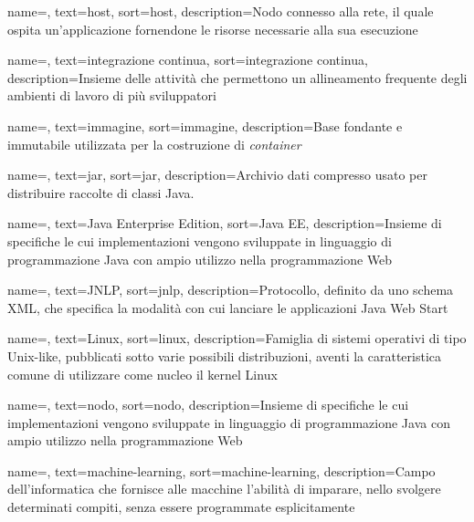 {
    name=,
    text=host,
    sort=host,
    description={Nodo connesso alla rete, il quale ospita un'applicazione fornendone le risorse necessarie alla sua esecuzione}
}

{
    name=,
    text=integrazione continua,
    sort=integrazione continua,
    description={Insieme delle attività che permettono un allineamento frequente degli ambienti di lavoro di più sviluppatori}
}

{
    name=,
    text=immagine,
    sort=immagine,
    description={Base fondante e immutabile utilizzata per la costruzione di \textit{container}}
}

{
    name=,
    text=jar,
    sort=jar,
    description={Archivio dati compresso usato per distribuire raccolte di classi Java.}
}
 
{
    name=,
    text=Java Enterprise Edition,
    sort=Java EE,
    description={Insieme di specifiche le cui implementazioni vengono sviluppate in linguaggio di programmazione Java con ampio utilizzo nella programmazione Web}
}

{
    name=,
    text=JNLP,
    sort=jnlp,
    description={Protocollo, definito da uno schema XML, che specifica la modalità con cui lanciare le applicazioni Java Web Start}
}

{
    name=,
    text=Linux,
    sort=linux,
    description={Famiglia di sistemi operativi di tipo Unix-like, pubblicati sotto varie possibili distribuzioni, aventi la caratteristica comune di utilizzare come nucleo il kernel Linux}
}

{
    name=,
    text=nodo,
    sort=nodo,
    description={Insieme di specifiche le cui implementazioni vengono sviluppate in linguaggio di programmazione Java con ampio utilizzo nella programmazione Web}
}

{
    name=,
    text=machine-learning,
    sort=machine-learning,
    description={Campo dell'informatica che fornisce alle macchine l'abilità di imparare, nello svolgere determinati compiti, senza essere programmate esplicitamente}
}

